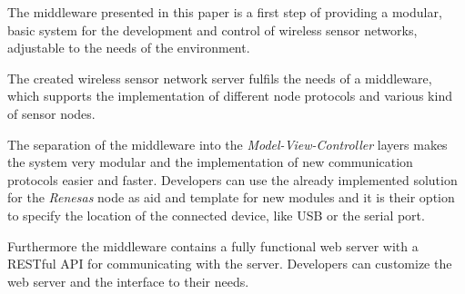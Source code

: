 The middleware presented in this paper is a first step of providing a modular, basic system for the development and control of wireless sensor networks, adjustable to the needs of the environment.

The created wireless sensor network server fulfils the needs of a middleware, which supports the implementation of different node protocols and various kind of sensor nodes. 

The separation of the middleware into the \textit{Model-View-Controller} layers makes the system very modular and the implementation of new communication protocols easier and faster. Developers can use the already implemented solution for the \textit{Renesas} node as aid and template for new modules and it is their option to specify the location of the connected device, like USB or the serial port. 

Furthermore the middleware contains a fully functional web server with a RESTful API for communicating with the server. Developers can customize the web server and the interface to their needs. 



